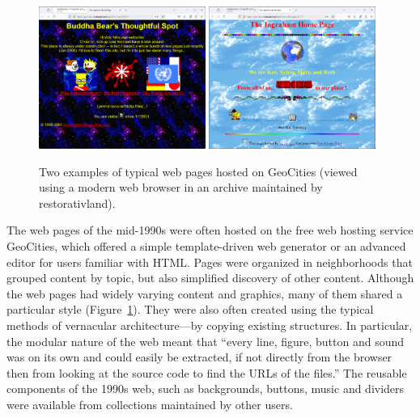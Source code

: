 \begin{figure}
\centering
\includegraphics[width=0.485\textwidth]{fig/geocities1.png}
\includegraphics[width=0.485\textwidth]{fig/geocities2.png}
\caption{Two examples of typical web pages hosted on GeoCities (viewed using a modern
web browser in an archive maintained by restorativland).}
\label{fig:geocities}
\end{figure}


The web pages of the mid-1990s were often hosted on the free web hosting service GeoCities, which
offered a simple template-driven web generator or an advanced editor for users familiar with HTML.
Pages were organized in neighborhoods that grouped content by topic, but also simplified discovery
of other content. Although the web pages had widely varying content and
graphics, many of them shared a particular style (Figure~\ref{fig:geocities}). They were also
often created using the typical methods of vernacular architecture---by copying existing structures.
In particular, the modular nature of the web meant that ``every line, figure, button and sound was
on its own and could easily be extracted, if not directly from the browser then from looking at the
source code to find the URLs of the files.'' The reusable components of the
1990s web, such as backgrounds, buttons, music and dividers were available from collections
maintained by other users.

